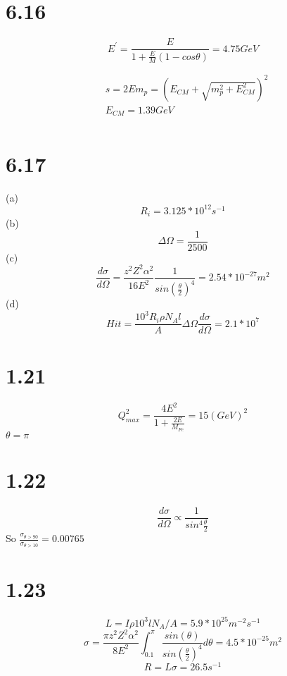 \documentclass{article}
\begin{document}
\begin{CJK*}{GBK}{song}
\section{6.16}

\begin{equation}
E^{'}=\frac{E}{1+\frac{E}{M}(1-cos\theta)}=4.75GeV
\end{equation}

\begin{equation}
\begin{aligned}
&s=2Em_p=(E_{CM}+\sqrt{m_p^2+E^2_{CM}})^2\\
&E_{CM}=1.39GeV\\
\end{aligned}
\end{equation}

\section{6.17}
(a)
\begin{equation}
R_i=3.125*10^{12}s^{-1}
\end{equation}
(b)
\begin{equation}
\Delta\Omega=\frac{1}{2500}
\end{equation}
(c)
\begin{equation}
\frac{d\sigma}{d\Omega}=\frac{ z^2Z^2\alpha^2}{16E^2} \frac{1}{sin(\frac{\theta}{2})^4}=2.54*10^{-27}m^2
\end{equation}
(d)
\begin{equation}
Hit=\frac{10^3R_i\rho N_A l}{A}\Delta\Omega\frac{d\sigma}{d\Omega}=2.1*10^7
\end{equation}

\section{1.21}
\begin{equation}
Q^2_{max}=\frac{4E^2}{1+\frac{2E}{M_{Fe}}}=15(GeV)^2
\end{equation}
$\theta=\pi$


\section{1.22}
\begin{equation}
\frac{d\sigma}{d\Omega}\propto\frac{1}{sin^4\frac{\theta}{2}}
\end{equation}
So $\frac{\sigma_{\theta>90}}{\sigma_{\theta>10}}=0.00765$
\section{1.23}
\begin{equation}
L=I\rho10^3lN_A/A=5.9*10^{25}m^{-2}s^{-1}
\end{equation}
\begin{equation}
\sigma=\frac{\pi z^2Z^2\alpha^2}{8E^2}\int_{0.1}^{\pi} \frac{sin(\theta)}{sin(\frac{\theta}{2})^4}d\theta=4.5*10^{-25}m^2
\end{equation}
\begin{equation}
R=L\sigma=26.5s^{-1}
\end{equation}


\end{CJK*}
\end{document}
